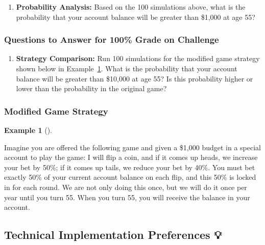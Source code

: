 \documentclass[
  letterpaper,
  DIV=11,
  numbers=noendperiod]{scrartcl}
\providecommand{\tightlist}{%
  \setlength{\itemsep}{0pt}\setlength{\parskip}{0pt}}
\theoremstyle{definition}
\newtheorem{example}{Example}[section]
\theoremstyle{remark}
\begin{document}
\begin{enumerate}
\def\labelenumi{\arabic{enumi}.}
\setcounter{enumi}{4}
\tightlist
\item
  \textbf{Probability Analysis:} Based on the 100 simulations above,
  what is the probability that your account balance will be greater than
  \$1,000 at age 55?
\end{enumerate}

\subsubsection{Questions to Answer for 100\% Grade on
Challenge}\label{questions-to-answer-for-100-grade-on-challenge}

\begin{enumerate}
\def\labelenumi{\arabic{enumi}.}
\setcounter{enumi}{5}
\tightlist
\item
  \textbf{Strategy Comparison:} Run 100 simulations for the modified
  game strategy shown below in
  Example~\ref{exm-ErgodicityEconomicsExampleModified}. What is the
  probability that your account balance will be greater than \$10,000 at
  age 55? Is this probability higher or lower than the probability in
  the original game?
\end{enumerate}

\subsubsection{Modified Game Strategy}\label{modified-game-strategy}

\begin{example}[]\protect\hypertarget{exm-ErgodicityEconomicsExampleModified}{}\label{exm-ErgodicityEconomicsExampleModified}

Imagine you are offered the following game and given a \$1,000 budget in
a special account to play the game: I will flip a coin, and if it comes
up heads, we increase your bet by 50\%; if it comes up tails, we reduce
your bet by 40\%. You must bet exactly 50\% of your current account
balance on each flip, and this 50\% is locked in for each round. We are
not only doing this once, but we will do it once per year until you turn
55. When you turn 55, you will receive the balance in your account.

\end{example}

\subsection{Technical Implementation Preferences
💡}\label{technical-implementation-preferences}
\end{document}
